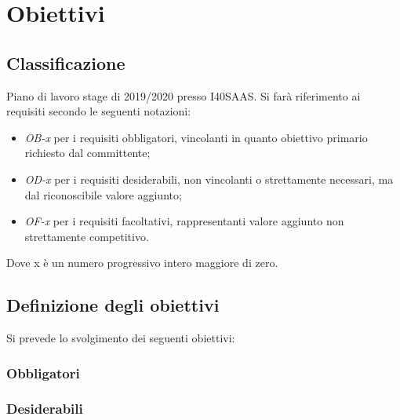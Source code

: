\section{Obiettivi}
\subsection{Classificazione}
Piano di lavoro stage di 2019/2020 presso I40SAAS.
Si farà riferimento ai requisiti secondo le seguenti notazioni:
\begin{itemize}
	\item \textit{OB-x} per i requisiti obbligatori, vincolanti in quanto obiettivo primario richiesto dal committente;
	\item \textit{OD-x} per i requisiti desiderabili, non vincolanti o strettamente necessari,
		  ma dal riconoscibile valore aggiunto;
	\item \textit{OF-x} per i requisiti facoltativi, rappresentanti valore aggiunto non strettamente competitivo.
\end{itemize}
Dove x è un numero progressivo intero maggiore di zero.

\subsection{Definizione degli obiettivi}
Si prevede lo svolgimento dei seguenti obiettivi:
\subsubsection*{Obbligatori}
	\begin{itemize}
		\obiettiviObbligatori
	\end{itemize}
\subsubsection*{Desiderabili} 
	\begin{itemize}
		\obiettiviDesiderabili
	\end{itemize}